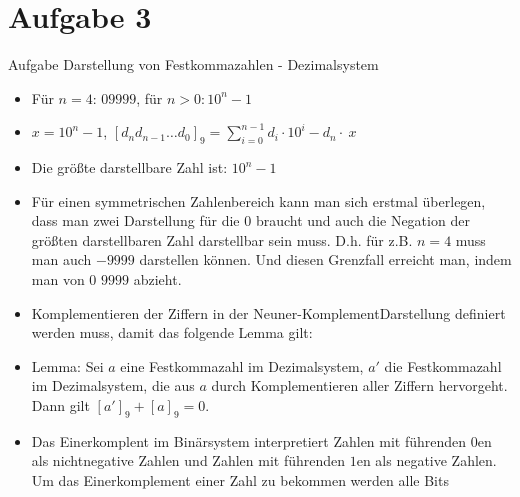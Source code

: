 
\section{Aufgabe 3}

\setcounter{exercise}{1}

\begin{frame}[allowframebreaks]{Aufgabe \thesection}{Darstellung von Festkommazahlen - Dezimalsystem}
  \begin{solution}
    \begin{itemize}
      \item Für $n=4$: $09999$, für $n>0: 10^n-1$
      \item $x=10^n-1$, $\displaystyle [d_{n}d_{n-1}\ldots d_{0}]_9=\sum_{i=0}^{n-1}d_{i}\cdot 10^{i}-d_{n}\cdot\ x$
      \item Die \alert{größte darstellbare Zahl} ist: $10^n - 1$
      \item Für einen symmetrischen Zahlenbereich kann man sich erstmal überlegen, dass man zwei Darstellung für die $0$ braucht und auch die Negation der größten darstellbaren Zahl darstellbar sein muss. D.h. für z.B. $n = 4$ muss man auch $-9999$ darstellen können. Und diesen Grenzfall erreicht man, indem man von $0$ $9999$ abzieht.
    \end{itemize}
  \end{solution}
  \begin{exercisenoinc}
    \begin{itemize}
      \item \alert{Komplementieren} der Ziffern in der \alert{Neuner-KomplementDarstellung} definiert werden muss, damit das folgende Lemma gilt:
      \item \alert{Lemma:} Sei $a$ eine Festkommazahl im Dezimalsystem, $a'$ die Festkommazahl im Dezimalsystem, die aus $a$ durch Komplementieren aller Ziffern hervorgeht. Dann gilt $[a']_9 + [a]_9 = 0$.
    \end{itemize}
  \end{exercisenoinc}
  \begin{solution}
    \begin{itemize}
      \item Das Einerkomplent im Binärsystem interpretiert Zahlen mit führenden $0$en als nichtnegative Zahlen und Zahlen
mit führenden $1$en als negative Zahlen. Um das Einerkomplement einer Zahl zu bekommen werden alle Bits

\end{itemize}
\end{solution}
\end{frame}
